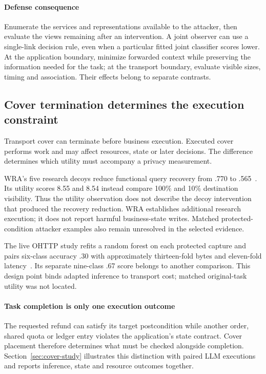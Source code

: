 \paragraph{Defense consequence}
Enumerate the services and representations available to the attacker, then evaluate the views remaining after an intervention. A joint observer can use a single-link decision rule, even when a particular fitted joint classifier scores lower. At the application boundary, minimize forwarded context while preserving the information needed for the task; at the transport boundary, evaluate visible sizes, timing and association. Their effects belong to separate contrasts.

\subsection{Cover termination determines the execution constraint}\label{sec:crosslink}
Transport cover can terminate before business execution. Executed cover performs work and may affect resources, state or later decisions. The difference determines which utility must accompany a privacy measurement.

WRA's five research decoys reduce functional query recovery from .770 to .565~\cite[Sec.~8.1]{jeong2026wra}. Its utility scores 8.55 and 8.54 instead compare 100\% and 10\% destination visibility. Thus the utility observation does not describe the decoy intervention that produced the recovery reduction. WRA establishes additional research execution; it does not report harmful business-state writes. Matched protected-condition attacker examples also remain unresolved in the selected evidence.

The live OHTTP study refits a random forest on each protected capture and pairs six-class accuracy .30 with approximately thirteen-fold bytes and eleven-fold latency~\cite[Sec.~9.7]{dangol2026workflow}. Its separate nine-class .67 score belongs to another comparison. This design point binds adapted inference to transport cost; matched original-task utility was not located.

\paragraph{Task completion is only one execution outcome}
The requested refund can satisfy its target postcondition while another order, shared quota or ledger entry violates the application's state contract. Cover placement therefore determines what must be checked alongside completion. Section~\ref{sec:cover-study} illustrates this distinction with paired LLM executions and reports inference, state and resource outcomes together.

